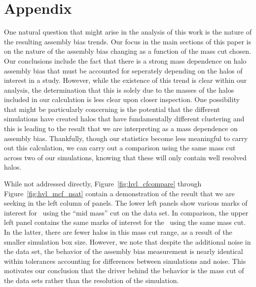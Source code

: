 \documentclass[usenatbib,usegraphicx,letterpaper]{mn2e}
\begin{document}
\section*{Appendix}
\label{section:appendix_massres}

One natural question that might arise in the analysis of this work is the nature of the resulting assembly bias
trends. Our focus in the main sections of this paper is on the nature of the assembly bias changing as a function
of the mass cut chosen. Our conclusions include the fact that there is a strong mass dependence on halo assembly
bias that must be accounted for seperately depending on the halos of interest in a study. However, while the
existence of this trend is clear within our analysis, the determination that this is solely due to the masses of
the halos included in our calculation is less clear upon closer inspection. One possibility that might be
particularly concerning is the potential that the different simulations have created halos that have
fundamentally different clustering and this is leading to the result that we are interpreting as a mass
dependence on assembly bias. Thankfully, though our statistics become less meaningful to carry out this
calculation, we can carry out a comparison using the same mass cut across two of our simulations, knowing that
these will only contain well resolved halos.

While not addressed directly, Figure~\ref{fig:hvl_cfcompare} through Figure~\ref{fig:hvl_mcf_nsat} contain a
demonstration of the result that we are seeking in the left column of panels. The lower left panels show various
marks of interest for \simB \ using the ``mid mass'' cut on the data set. In comparison, the upper left panel
contains the same marks of interest for the \simA \ using the same mass cut. In the latter, there are fewer halos
in this mass cut range, as a result of the smaller simulation box size. However, we note that despite the
additional noise in the data set, the behavior of the assembly bias measurement is nearly identical within
tolerances accounting for differences between simulations and noise. This motivates our conclusion that the
driver behind the behavior is the mass cut of the data sets rather than the resolution of the simulation.

\label{lastpage}
\end{document}
